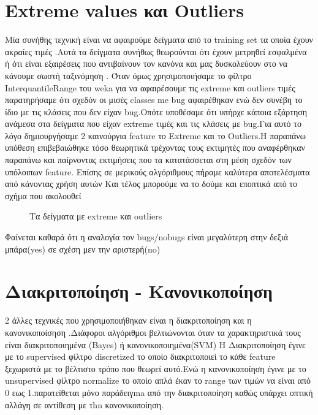  \section { Extreme values και Outliers }
 Μία συνήθης τεχνική είναι να αφαιρούμε δείγματα από το training set τα οποία  έχουν ακραίες τιμές  .Αυτά τα δείγματα συνήθως θεωρούνται ότι έχουν μετρηθεί εσφαλμένα  ή ότι είναι εξαιρέσεις που αντιβαίνουν τον κανόνα και μας δυσκολεύουν στο να κάνουμε σωστή ταξινόμηση . Όταν  όμως χρησιμοποιήσαμε το φίλτρο ΙnterquantileRange του weka για να αφαιρέσουμε τις extreme και outliers τιμές παρατηρήσαμε ότι σχεδόν οι μισές classes me bug αφαιρέθηκαν ενώ δεν συνέβη το ίδιο με τις κλάσεις που δεν είχαν bug.Οπότε υποθέσαμε ότι  υπήρχε κάποια εξάρτηση ανάμεσα στα δείγματα που είχαν extreme τιμές και τις κλάσεις με bug.Για αυτό το λόγο δημιουργήσαμε 2 καινούργια feature το Extreme και το Outliers.Η παραπάνω υπόθεση επιβεβαιώθηκε τόσο θεωρητικά τρέχοντας τους εκτιμητές που αναφέρθηκαν παραπάνω και παίρνοντας εκτιμήσεις που τα κατατάσσεται στη μέση σχεδόν των υπόλοιπων feature. Επίσης σε μερικούς αλγόριθμους πήραμε καλύτερα αποτελέσματα από κάνοντας χρήση αυτών Και τέλος μπορούμε να το δούμε και εποπτικά από το σχήμα που ακολουθεί
 \begin{figure}[h!]
	\centering
	\caption{Τα δείγματα με extreme και outliers}
\end{figure}

Φαίνεται καθαρά ότι η αναλογία τον bugs/nobugs είναι μεγαλύτερη στην δεξιά μπάρα(yes) σε σχέση μεν την αριστερή(no)
 \section { Διακριτοποίηση - Κανονικοποίηση  }
 2 άλλες τεχνικές που χρησιμοποιήθηκαν είναι  η διακριτοποίηση και η κανονικοποίσηση .Διάφοροι αλγόριθμοι βελτιώνονται όταν τα χαρακτηριστικά τους είναι διακριτοποιημένα (Bayes) ή κανονικοποιημένα(SVM)
 H Διακριτοποίηση έγινε με το supervised φίλτρο discretized το οποίο διακριτοποιεί το κάθε feature ξεχωριστά με το βέλτιστο τρόπο που θεωρεί αυτό.Ενώ η κανονικοποίηση έγινε με το unsupervised φίλτρο normalize το οποίο απλά έκαν το range των τιμών να είναι από 0 εως 1.παρατείθεται μόνο παράδειγma από την διακριτοποίηση καθώς υπάρχει οπτική αλλάγη σε αντίθεση με τhn κανονικοποίηση.
 
